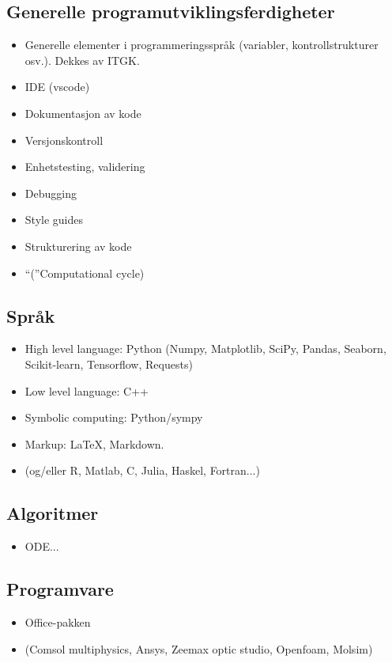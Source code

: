 \subsection{Generelle programutviklingsferdigheter}
\begin{itemize}
	\item Generelle elementer i programmeringsspråk (variabler, kontrollstrukturer osv.). Dekkes av ITGK.
	\item IDE (vscode)
	\item Dokumentasjon av kode
	\item Versjonskontroll
	\item Enhetstesting, validering
	\item Debugging
	\item Style guides
	\item Strukturering av kode
	\item \enquote(Computational cycle)
\end{itemize}

\subsection{Språk}
\begin{itemize}
	\item High level language: Python (Numpy, Matplotlib, SciPy, Pandas, Seaborn, Scikit-learn, Tensorflow, Requests)
	\item Low level language: C++
	\item Symbolic computing: Python/sympy
	\item Markup: LaTeX, Markdown.
	\item (og/eller R, Matlab, C, Julia, Haskel, Fortran...)
\end{itemize}

\subsection{Algoritmer}
\begin{itemize}
	\item ODE...
\end{itemize}


\subsection{Programvare}
\begin{itemize}
	\item Office-pakken
	\item (Comsol multiphysics, Ansys, Zeemax optic studio, Openfoam, Molsim)
\end{itemize}


